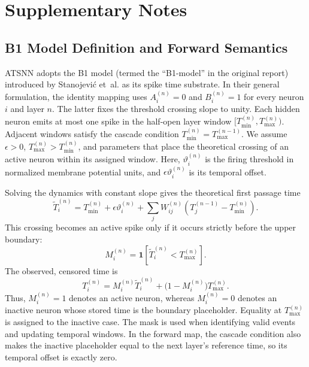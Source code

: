 ﻿\documentclass[12pt]{article}
\begin{document}
\section{Supplementary Notes}

\subsection{B1 Model Definition and Forward Semantics}

ATSNN adopts the B1 model (termed the ``B1-model'' in the original report) introduced by Stanojevi\'{c} et~al. \cite{ref46} as its spike time substrate. In their general formulation, the identity mapping uses $A_i^{(n)}=0$ and $B_i^{(n)}=1$ for every neuron $i$ and layer $n$. The latter fixes the threshold crossing slope to unity. Each hidden neuron emits at most one spike in the half-open layer window $[T_{\min}^{(n)},T_{\max}^{(n)})$. Adjacent windows satisfy the cascade condition $T_{\min}^{(n)}=T_{\max}^{(n-1)}$. We assume $\epsilon>0$, $T_{\max}^{(n)}>T_{\min}^{(n)}$, and parameters that place the theoretical crossing of an active neuron within its assigned window. Here, $\vartheta_i^{(n)}$ is the firing threshold in normalized membrane potential units, and $\epsilon\vartheta_i^{(n)}$ is its temporal offset.

Solving the dynamics with constant slope gives the theoretical first passage time
\begin{equation}
\tilde{T}_i^{(n)} = T_{\min}^{(n)} + \epsilon\vartheta_i^{(n)} + \sum_j W_{ij}^{(n)}\!\left(T_j^{(n-1)} - T_{\min}^{(n)}\right).
\label{eq:supp_theoretical_time}
\end{equation}
This crossing becomes an active spike only if it occurs strictly before the upper boundary:
\begin{equation}
M_i^{(n)} = \mathbf{1}\!\left[\tilde{T}_i^{(n)} < T_{\max}^{(n)}\right].
\label{eq:b1_mask}
\end{equation}
The observed, censored time is
\begin{equation}
T_i^{(n)} = M_i^{(n)}\tilde{T}_i^{(n)} + \bigl(1-M_i^{(n)}\bigr)T_{\max}^{(n)}.
\label{eq:supp_actual_time}
\end{equation}
Thus, $M_i^{(n)}=1$ denotes an active neuron, whereas $M_i^{(n)}=0$ denotes an inactive neuron whose stored time is the boundary placeholder. Equality at $T_{\max}^{(n)}$ is assigned to the inactive case. The mask is used when identifying valid events and updating temporal windows. In the forward map, the cascade condition also makes the inactive placeholder equal to the next layer's reference time, so its temporal offset is exactly zero.
\end{document}
